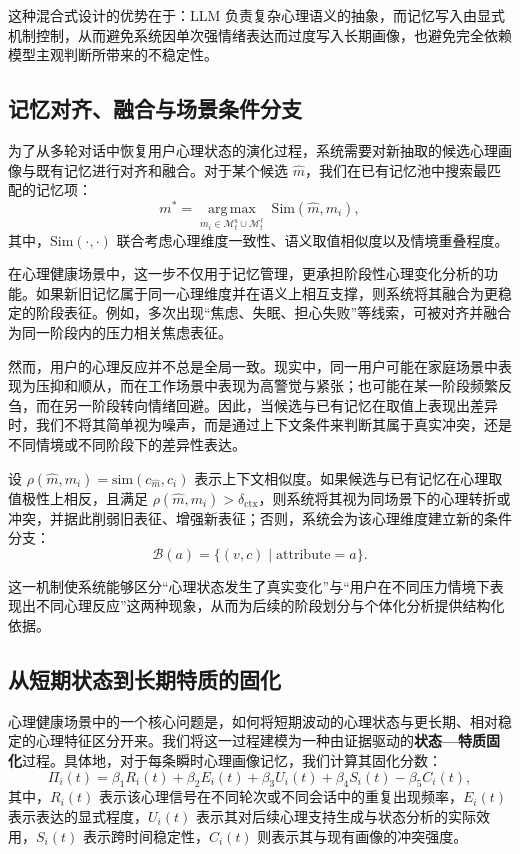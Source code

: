 \documentclass[12pt,a4paper]{article}
\begin{document}
这种混合式设计的优势在于：LLM 负责复杂心理语义的抽象，而记忆写入由显式机制控制，从而避免系统因单次强情绪表达而过度写入长期画像，也避免完全依赖模型主观判断所带来的不稳定性。

\subsection{记忆对齐、融合与场景条件分支}

为了从多轮对话中恢复用户心理状态的演化过程，系统需要对新抽取的候选心理画像与既有记忆进行对齐和融合。对于某个候选 $\hat{m}$，我们在已有记忆池中搜索最匹配的记忆项：
\begin{equation}
m^* = \operatorname*{arg\,max}_{m_i \in \mathcal{M}^{\text{s}}_t \cup \mathcal{M}^{\ell}_t} \; \text{Sim}(\hat{m}, m_i),
\label{eq:align}
\end{equation}
其中，$\text{Sim}(\cdot, \cdot)$ 联合考虑心理维度一致性、语义取值相似度以及情境重叠程度。

在心理健康场景中，这一步不仅用于记忆管理，更承担阶段性心理变化分析的功能。如果新旧记忆属于同一心理维度并在语义上相互支撑，则系统将其融合为更稳定的阶段表征。例如，多次出现``焦虑、失眠、担心失败''等线索，可被对齐并融合为同一阶段内的压力相关焦虑表征。

然而，用户的心理反应并不总是全局一致。现实中，同一用户可能在家庭场景中表现为压抑和顺从，而在工作场景中表现为高警觉与紧张；也可能在某一阶段频繁反刍，而在另一阶段转向情绪回避。因此，当候选与已有记忆在取值上表现出差异时，我们不将其简单视为噪声，而是通过上下文条件来判断其属于真实冲突，还是不同情境或不同阶段下的差异性表达。

设 $\rho(\hat{m}, m_i) = \text{sim}(c_{\hat{m}}, c_i)$ 表示上下文相似度。如果候选与已有记忆在心理取值极性上相反，且满足 $\rho(\hat{m}, m_i) > \delta_{\text{ctx}}$，则系统将其视为同场景下的心理转折或冲突，并据此削弱旧表征、增强新表征；否则，系统会为该心理维度建立新的条件分支：
\begin{equation}
\mathcal{B}(a) = \{(v, c) \mid \text{attribute} = a\}.
\label{eq:branch}
\end{equation}

这一机制使系统能够区分``心理状态发生了真实变化''与``用户在不同压力情境下表现出不同心理反应''这两种现象，从而为后续的阶段划分与个体化分析提供结构化依据。

\subsection{从短期状态到长期特质的固化}

心理健康场景中的一个核心问题是，如何将短期波动的心理状态与更长期、相对稳定的心理特征区分开来。我们将这一过程建模为一种由证据驱动的\textbf{状态—特质固化}过程。具体地，对于每条瞬时心理画像记忆，我们计算其固化分数：
\begin{equation}
\Pi_i(t) = \beta_1 R_i(t) + \beta_2 E_i(t) + \beta_3 U_i(t) + \beta_4 S_i(t) - \beta_5 C_i(t),
\label{eq:consolidation}
\end{equation}
其中，$R_i(t)$ 表示该心理信号在不同轮次或不同会话中的重复出现频率，$E_i(t)$ 表示表达的显式程度，$U_i(t)$ 表示其对后续心理支持生成与状态分析的实际效用，$S_i(t)$ 表示跨时间稳定性，$C_i(t)$ 则表示其与现有画像的冲突强度。
\end{document}
